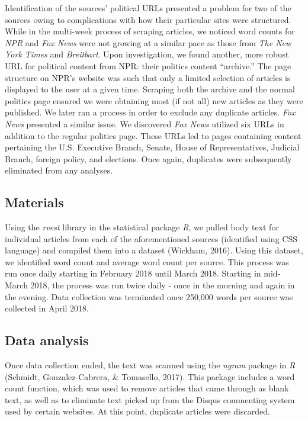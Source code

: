 \documentclass[,man]{apa6}
\begin{document}
Identification of the sources' political URLs presented a problem for
two of the sources owing to complications with how their particular
sites were structured. While in the multi-week process of scraping
articles, we noticed word counts for \emph{NPR} and \emph{Fox News} were
not growing at a similar pace as those from \emph{The New York Times}
and \emph{Breitbart}. Upon investigation, we found another, more robust
URL for political content from NPR: their politics content
\enquote{archive.} The page structure on NPR's website was such that
only a limited selection of articles is displayed to the user at a given
time. Scraping both the archive and the normal politics page ensured we
were obtaining most (if not all) new articles as they were published. We
later ran a process in order to exclude any duplicate articles.
\emph{Fox News} presented a similar issue. We discovered \emph{Fox News}
utilized six URLs in addition to the regular politics page. These URLs
led to pages containing content pertaining the U.S. Executive Branch,
Senate, House of Representatives, Judicial Branch, foreign policy, and
elections. Once again, duplicates were subsequently eliminated from any
analyses.

\subsection{Materials}\label{materials}

Using the \emph{rvest} library in the statistical package \emph{R}, we
pulled body text for individual articles from each of the aforementioned
sources (identified using CSS language) and compiled them into a dataset
(Wickham, 2016). Using this dataset, we identified word count and
average word count per source. This process was run once daily starting
in February 2018 until March 2018. Starting in mid-March 2018, the
process was run twice daily - once in the morning and again in the
evening. Data collection was terminated once 250,000 words per source
was collected in April 2018.

\subsection{Data analysis}\label{data-analysis}

Once data collection ended, the text was scanned using the \emph{ngram}
package in \emph{R} (Schmidt, Gonzalez-Cabrera, \& Tomasello, 2017).
This package includes a word count function, which was used to remove
articles that came through as blank text, as well as to eliminate text
picked up from the Disqus commenting system used by certain websites. At
this point, duplicate articles were discarded.
\end{document}
